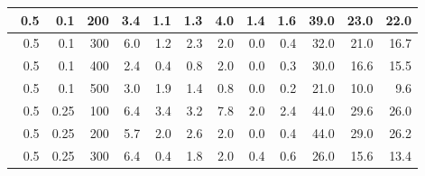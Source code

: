 \begin{longtable}{|r|r|r|r|r|r|r|r|r|r|r|r|}
        \hline \
        0.5                            & 0.1                     & 200                       & 3.4                       & 1.1                       & 1.3                       & 4.0                       & 1.4                       & 1.6                       & 39.0                      & 23.0                      & 22.0                      \\
        \hline \
        0.5                            & 0.1                     & 300                       & 6.0                       & 1.2                       & 2.3                       & 2.0                       & 0.0                       & 0.4                       & 32.0                      & 21.0                      & 16.7                       \\
        \hline \
        0.5                            & 0.1                    & 400                       & 2.4                       & 0.4                       & 0.8                       & 2.0                       & 0.0                       & 0.3                       & 30.0                      & 16.6                      & 15.5                      \\
        \hline \
        0.5                            & 0.1                    & 500                       & 3.0                       & 1.9                       & 1.4                       & 0.8                       & 0.0                       & 0.2                       & 21.0                      & 10.0                      & 9.6                      \\
        \hline \
        0.5                            & 0.25                    & 100                       & 6.4                       & 3.4                       & 3.2                       & 7.8                       & 2.0                       & 2.4                       & 44.0                      & 29.6                      & 26.0                      \\
        \hline \
        0.5                            & 0.25                    & 200                       & 5.7                       & 2.0                       & 2.6                       & 2.0                       & 0.0                       & 0.4                       & 44.0                      & 29.0                      & 26.2                      \\
        \hline \
        0.5                            & 0.25                    & 300                       & 6.4                       & 0.4                       & 1.8                       & 2.0                       & 0.4                       & 0.6                       & 26.0                      & 15.6                      & 13.4                      \\

\end{longtable}
